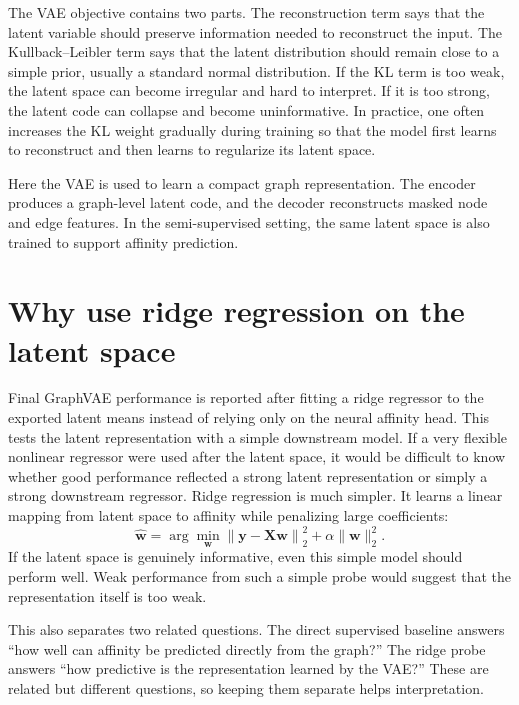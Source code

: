 The VAE objective contains two parts. The reconstruction term says that the latent variable should preserve information needed to reconstruct the input. The Kullback--Leibler term says that the latent distribution should remain close to a simple prior, usually a standard normal distribution. If the KL term is too weak, the latent space can become irregular and hard to interpret. If it is too strong, the latent code can collapse and become uninformative. In practice, one often increases the KL weight gradually during training so that the model first learns to reconstruct and then learns to regularize its latent space.

Here the VAE is used to learn a compact graph representation. The encoder produces a graph-level latent code, and the decoder reconstructs masked node and edge features. In the semi-supervised setting, the same latent space is also trained to support affinity prediction.

\section{Why use ridge regression on the latent space}

Final GraphVAE performance is reported after fitting a ridge regressor to the exported latent means instead of relying only on the neural affinity head. This tests the latent representation with a simple downstream model. If a very flexible nonlinear regressor were used after the latent space, it would be difficult to know whether good performance reflected a strong latent representation or simply a strong downstream regressor. Ridge regression is much simpler. It learns a linear mapping from latent space to affinity while penalizing large coefficients:
\begin{equation}
\hat{\mathbf{w}}
=
\arg\min_{\mathbf{w}}
\left\|
\mathbf{y} - \mathbf{X}\mathbf{w}
\right\|_2^2
+
\alpha \|\mathbf{w}\|_2^2.
\end{equation}
If the latent space is genuinely informative, even this simple model should perform well. Weak performance from such a simple probe would suggest that the representation itself is too weak.

This also separates two related questions. The direct supervised baseline answers ``how well can affinity be predicted directly from the graph?'' The ridge probe answers ``how predictive is the representation learned by the VAE?'' These are related but different questions, so keeping them separate helps interpretation.

